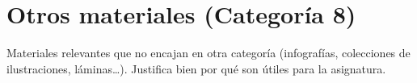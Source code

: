 \chapter{Otros materiales (Categoría 8)}

\begin{introcategoria}
Materiales relevantes que no encajan en otra categoría (infografías, colecciones de
ilustraciones, láminas\ldots). Justifica bien por qué son útiles para la asignatura.
\end{introcategoria}

